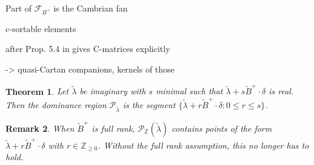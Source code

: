 \documentclass{amsart}
\newtheorem{theorem}{Theorem}
\newtheorem{remark}[theorem]{Remark}
\numberwithin{theorem}{section}
\newcommand{\cF}{\mathcal{F}}
\newcommand{\cP}{\mathcal{P}}
\newcommand{\ZZ}{\mathbb{Z}}
\begin{document}
  Part of $\cF_{B^+}$ is the Cambrian fan
  
  c-sortable elements
  
  after Prop. 5.4 in \cite{combinatorial frameworks} gives C-matrices explicitly
  
  -> quasi-Cartan companions, kernels of those

  \begin{theorem}
    Let $\tilde\lambda$ be imaginary with $s$ minimal such that $\tilde\lambda+s\widetilde B^+\cdot\delta$ is real.
    Then the dominance region $\cP_{\tilde\lambda}$ is the segment $\{\tilde\lambda+r\widetilde B^+\cdot\delta:0\le r\le s\}$.
  \end{theorem}
  \begin{remark}
    When $\widetilde B^+$ is full rank, $\cP_\ZZ(\tilde\lambda)$ contains points of the form $\tilde\lambda+r\widetilde B^+\cdot\delta$ with $r\in\ZZ_{\ge0}$.
    Without the full rank assumption, this no longer has to hold.
  \end{remark}
\end{document}
